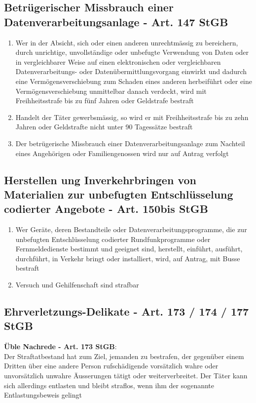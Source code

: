 \documentclass{report}
\theoremstyle{definition}
\theoremstyle{example}
\begin{document}
\subsection{Betrügerischer Missbrauch einer Datenverarbeitungsanlage - Art. 147 StGB}
\begin{enumerate}
   \item Wer in der Absicht, sich oder einen anderen unrechtmässig zu bereichern, durch unrichtige, unvollständige oder unbefugte Verwendung von Daten oder in vergleichbarer Weise auf einen elektronischen oder vergleichbaren Datenverarbeitungs- oder Datenübermittlungsvorgang einwirkt und dadurch eine Vermögensverschiebung zum Schaden eines anderen herbeiführt oder eine Vermögensverschiebung unmittelbar danach verdeckt, wird mit Freihheitsstrafe bis zu fünf Jahren oder Geldstrafe bestraft
   \item Handelt der Täter gewerbsmässig, so wird er mit Freihheitsstrafe bis zu zehn Jahren oder Geldstrafte nicht unter 90 Tagessätze bestraft
   \item Der betrügerische Missbrauch einer Datenverarbeitungsanlage zum Nachteil eines Angehörigen oder Familiengenossen wird nur auf Antrag verfolgt
\end{enumerate}

\subsection{Herstellen ung Inverkehrbringen von Materialien zur unbefugten Entschlüsselung codierter Angebote - Art. 150bis StGB}
\begin{enumerate}
   \item Wer Geräte, deren Bestandteile oder Datenverarbeitungsprogramme, die zur unbefugten Entschlüsselung codierter Rundfunkprogramme oder Fernmeldedienste bestimmt und geeignet sind, herstellt, einführt, ausführt, durchführt, in Verkehr bringt oder installiert, wird, auf Antrag, mit Busse bestraft
   \item Versuch und Gehilfenschaft sind strafbar
\end{enumerate}

\subsection{Ehrverletzungs-Delikate - Art. 173 / 174 / 177 StGB}
\textbf{Üble Nachrede - Art. 173 StGB}:\\
Der Straftatbestand hat zum Ziel, jemanden zu bestrafen, der gegenüber einem Dritten über eine andere Person rufschädigende vorsätzlich wahre oder unvorsätzlich unwahre Äusserungen tätigt oder weiterverbreitet. Der Täter kann sich allerdings entlasten und bleibt straflos, wenn ihm der sogenannte Entlastungsbeweis gelingt\\
\end{document}
